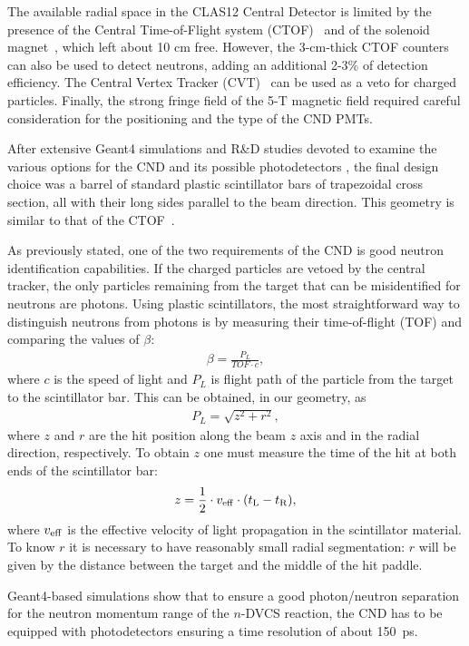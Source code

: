 The available radial space in the CLAS12 Central Detector is limited by the presence of the Central Time-of-Flight system (CTOF)~\cite{ctof-nim} and of the solenoid magnet~\cite{magnets-nim}, which left about 10 cm free. 
However, the 3-cm-thick CTOF counters can also be used to detect neutrons, adding an additional 2-3\% of detection efficiency. 
The Central Vertex Tracker (CVT)~\cite{svt-nim,mm-nim} can be used as a veto for charged particles.
Finally, the strong fringe field of the 5-T magnetic field required careful consideration for the positioning and the type of the CND PMTs.

After extensive Geant4 simulations and R\&D studies devoted to examine the various options for the CND and its possible photodetectors \cite{Niccolai:2018qzm}, the final design choice was a barrel of standard plastic scintillator bars of trapezoidal cross section, all with their long sides parallel to the beam direction. This geometry is similar to that of the CTOF~\cite{ctof-nim}. 

As previously stated, one of the two requirements of the CND is good neutron identification capabilities. If the charged particles are vetoed by the central tracker, the only particles remaining from the target that can be misidentified for neutrons are photons. Using plastic scintillators, the most straightforward way to distinguish neutrons from photons is by measuring their time-of-flight (TOF) and comparing the values of $\beta$:
\begin{eqnarray}
\beta= \frac{P_L}{TOF\cdot c},
\end{eqnarray}
where $c$ is the speed of light and $P_L$ is flight path of the particle from the target to the scintillator bar. This can be obtained, in our geometry, as
\begin{eqnarray}
P_L = \sqrt{z^2+r^2},
\end{eqnarray}
where $z$ and $r$ are the hit position along the beam $z$ axis and in the radial direction, respectively. To obtain $z$ one must measure the time of the hit at both ends of the scintillator bar:
\begin{eqnarray}
z=\frac{1}{2} \cdot v_{\rm eff} \cdot (t_{\rm L}-t_{\rm R}),
\end{eqnarray}
where $v_{\rm eff}$ is the effective velocity of light propagation in the scintillator material. To know $r$ it is necessary to have reasonably small radial segmentation: $r$ will be given by the distance between the target and the middle of the hit paddle.
   
Geant4-based simulations show that to ensure a good photon/neutron separation for the neutron momentum range of the $n$-DVCS reaction, the CND has to be equipped with photodetectors ensuring a time resolution of about 150~ps. 


